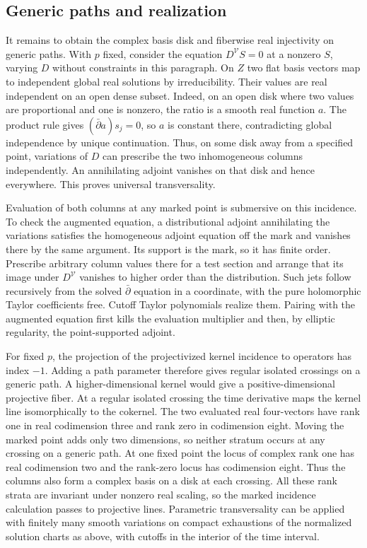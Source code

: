 \subsection{Generic paths and realization}
It remains to obtain the complex basis disk and fiberwise real
injectivity on generic paths. With $p$ fixed, consider the equation
$D^{\mathcal V}S=0$ at a nonzero $S$, varying $D$ without constraints
in this paragraph. On $Z$ two flat basis vectors map to independent
global real solutions by irreducibility. Their values are real
independent on an open dense subset. Indeed, on an open disk where two
values are proportional and one is nonzero, the ratio is a smooth
real function $a$. The product rule gives $(\bar\partial a)s_j=0$,
so $a$ is constant there, contradicting global independence by
unique continuation. Thus, on some disk away from a specified point,
variations of $D$ can prescribe the two inhomogeneous columns
independently. An annihilating adjoint vanishes on that disk and hence
everywhere. This proves universal transversality.

Evaluation of both columns at any marked point is submersive on
this incidence. To check the augmented equation, a distributional
adjoint annihilating the variations satisfies the homogeneous adjoint
equation off the mark and vanishes there by the same argument.
Its support is the mark, so it has finite order. Prescribe arbitrary
column values there for a test section and arrange that its image
under $D^{\mathcal V}$ vanishes to higher order than the distribution.
Such jets follow recursively from the solved $\bar\partial$ equation
in a coordinate, with the pure holomorphic Taylor coefficients free.
Cutoff Taylor polynomials realize them. Pairing with the augmented
equation first kills the evaluation multiplier and then, by elliptic
regularity, the point-supported adjoint.

For fixed $p$, the projection of the projectivized kernel incidence
to operators has index $-1$. Adding a path parameter therefore gives
regular isolated crossings on a generic path. A higher-dimensional
kernel would give a positive-dimensional projective fiber. At a
regular isolated crossing the time derivative maps the kernel line
isomorphically to the cokernel. The two evaluated real four-vectors
have rank one in real codimension three and rank zero in codimension
eight. Moving the marked point adds only two dimensions, so neither
stratum occurs at any crossing on a generic path. At one fixed point
the locus of complex rank one has real codimension two and the rank-zero
locus has codimension eight. Thus the columns also form a complex
basis on a disk at each crossing. All these rank strata are invariant
under nonzero real scaling, so the marked incidence calculation
passes to projective lines. Parametric transversality can be
applied with finitely many smooth variations on compact exhaustions
of the normalized solution charts as above, with cutoffs in the
interior of the time interval.

